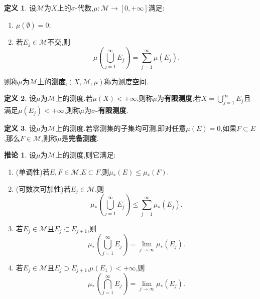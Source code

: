 \documentclass{ctexart}
\theoremstyle{definition}
\newtheorem{definition}{定义}
\newtheorem{corollary}{推论}
\theoremstyle{remark}
\begin{document}
	\begin{definition}
		设$\mathcal{M}$为$X$上的$\sigma$-代数,$\mu:\mathcal{M}\to[0,+\infty]$满足:
		\begin{enumerate}
			\item $\mu(\emptyset)=0$;
			\item 若$E_j\in\mathcal{M}$不交,则
			$$\mu\left(\bigcup_{j=1}^\infty{E_j}\right)=\sum_{j=1}^\infty{\mu(E_j)}.$$
		\end{enumerate}
		则称$\mu$为$\mathcal{M}$上的\textbf{测度},$(X,\mathcal{M},\mu)$称为测度空间.
	\end{definition}
	\begin{definition}
		设$\mu$为$\mathcal{M}$上的测度.若$\mu(X)<+\infty$,则称$\mu$为\textbf{有限测度};若$X=\bigcup_{j=1}^\infty{E_j}$且满足$\mu(E_j)<+\infty$,则称$\mu$为\textbf{$\sigma$-有限测度}.
	\end{definition}
	\begin{definition}
		设$\mu$为$\mathcal{M}$上的测度.若零测集的子集均可测,即对任意$\mu(E)=0$,如果$F\subset E$,那么$F\in\mathcal{M}$,则称$\mu$是\textbf{完备测度}.
	\end{definition}
	\begin{corollary}
		设$\mu$为$\mathcal{M}$上的测度,则它满足:
		\begin{enumerate}
			\item (单调性)若$E,F\in\mathcal{M}$,$E\subset F$,则$\mu_*(E)\le \mu_*(F)$.
			\item (可数次可加性)若$E_j\in\mathcal{M}$,则
			$$\mu_*\left(\bigcup_{j=1}^\infty{E_j}\right)\le\sum_{j=1}^\infty{\mu_*(E_j)}.$$
			\item 若$E_j\in\mathcal{M}$且$E_j\subset E_{j+1}$,则
			$$\mu_*\left(\bigcup_{j=1}^\infty{E_j}\right)=\lim_{j\to\infty}{\mu_*(E_j)}.$$
			\item 若$E_j\in\mathcal{M}$且$E_j\supset E_{j+1}$,$\mu(E_1)<+\infty$,则
			$$\mu_*\left(\bigcap_{j=1}^\infty{E_j}\right)=\lim_{j\to\infty}{\mu_*(E_j)}.$$
		\end{enumerate}
	\end{corollary}
	
\end{document}
